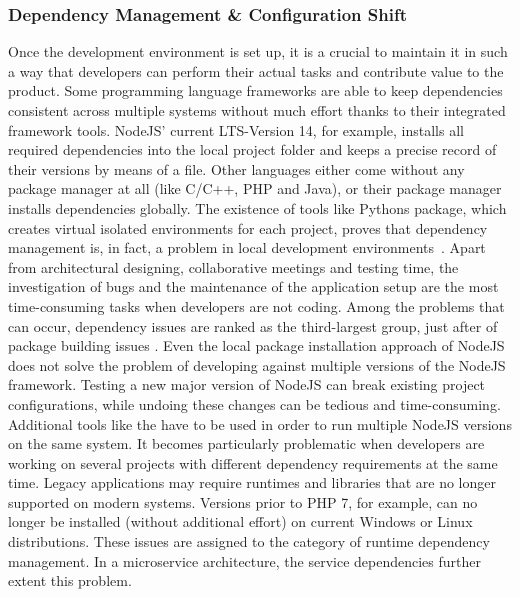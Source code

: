         \subsubsection{Dependency Management \& Configuration Shift}\label{sssec::dependency}
        Once the development environment is set up, it is a crucial to maintain it in such a way that developers can perform their actual tasks and contribute value to the product. Some programming language frameworks are able to keep dependencies consistent across multiple systems without much effort thanks to their integrated framework tools. NodeJS' current \ac{LTS}-Version 14, for example, installs all required dependencies into the local project folder and keeps a precise record of their versions by means of a  file. Other languages either come without any package manager at all (like C/C++, PHP and Java), or their package manager installs dependencies globally. The existence of tools like Pythons  package, which creates virtual isolated environments for each project, proves that dependency management is, in fact, a problem in local development environments~\cite{pythonvenv}. Apart from architectural designing, collaborative meetings and testing time, the investigation of bugs and the maintenance of the application setup are the most time-consuming tasks when developers are not coding. Among the problems that can occur, dependency issues are ranked as the third-largest group, just after of package building issues \cite{setuppain}.\newline
        Even the local package installation approach of NodeJS does not solve the problem of developing against multiple versions of the NodeJS framework. Testing a new major version of NodeJS can break existing project configurations, while undoing these changes can be tedious and time-consuming. Additional tools like the  have to be used in order to run multiple NodeJS versions on the same system. It becomes particularly problematic when developers are working on several projects with different dependency requirements at the same time. Legacy applications may require runtimes and libraries that are no longer supported on modern systems. Versions prior to PHP 7, for example, can no longer be installed (without additional effort) on current Windows or Linux distributions. These issues are assigned to the category of runtime dependency management. In a microservice architecture, the service dependencies further extent this problem. \newline
